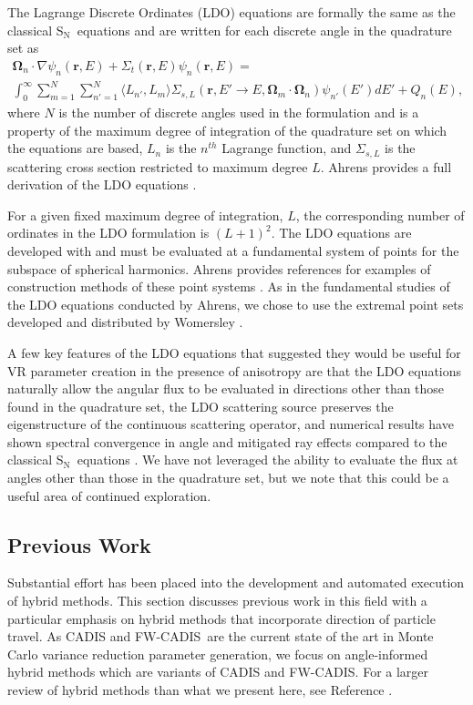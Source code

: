 \documentclass{article} %
\newcommand{\bo}{\mathbf\Omega}
\newcommand{\vecr}{\textbf{r}}
\newcommand{\sn}{S$_\mathrm{N}$}
\newcommand{\fwc}{\mbox{FW-CADIS}}
\begin{document}
The Lagrange Discrete Ordinates (LDO) equations are formally the same as the
classical \sn\ equations and are written for each discrete angle in the quadrature
set as
%
\begin{multline}
\bo_n\cdot\nabla\psi_{n}(\vecr,E) + 
\Sigma_{t}(\vecr,E)\psi_{n}(\vecr,E) = \\
\int_0^\infty\sum_{m=1}^{N}\sum_{n'=1}^{N}\langle L_{n'},L_{m}\rangle
\Sigma_{s,L}(\vecr,E'\rightarrow E,\bo_{m}\cdot\bo_n)\psi_{n'}(E')dE'
+ Q_{n}(E),
\end{multline}
%
where $N$ is the number of discrete angles used in the formulation
and is a property of the maximum degree of integration of the quadrature set
on which the equations are based, $L_n$ is the $n^{th}$ Lagrange function, and
$\Sigma_{s,L}$ is the scattering cross section restricted to maximum degree
$L$. Ahrens provides a full derivation of the LDO equations \cite{ahrens}.

For a given fixed maximum degree of integration, $L$, the corresponding number
of ordinates in the LDO formulation is $(L+1)^2$. The LDO equations are
developed with and must be evaluated at a fundamental system of points for the
subspace of spherical harmonics. Ahrens provides references for examples of
construction methods of these point systems \cite{ahrens}. As in the
fundamental studies of the LDO equations conducted by Ahrens, we chose to use
the extremal point sets developed and distributed by Womersley \cite{wom}.

A few key features of the LDO equations that suggested they would be useful for
VR parameter creation in the presence of anisotropy are that the LDO equations
naturally allow the angular flux to be evaluated in directions other than those
found in the quadrature set, the LDO scattering source preserves the
eigenstructure of the continuous scattering operator, and numerical results have
shown spectral convergence in angle and mitigated ray effects compared to the
classical \sn\ equations \cite{ahrens}. We have not leveraged the ability to
evaluate the flux at angles other than those in the quadrature set, but we note
that this could be a useful area of continued exploration.

\subsection{Previous Work}

Substantial effort has been placed into the development and automated
execution of hybrid methods. This section discusses previous work in this
field with a particular emphasis on hybrid methods that incorporate
direction of particle travel. As CADIS and \fwc\ are the current state of the
art in Monte Carlo variance reduction parameter generation, we focus on
angle-informed hybrid methods which are variants of CADIS and \fwc. For a
larger review of hybrid methods than what we present here, see
Reference \cite{munk-review}.
\end{document}
